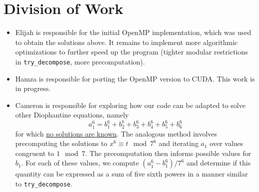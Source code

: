 \documentclass[11pt, letterpaper]{article}
\begin{document}
\section*{Division of Work}
\begin{itemize}
  \item Elijah is responsible for the initial OpenMP implementation, which was used to obtain the solutions above. It remains to implement more algorithmic optimizations to further speed up the program (tighter modular restrictions in \texttt{try\_decompose}, more precomputation).
  \item Hamza is responsible for porting the OpenMP version to CUDA. This work is in progress.
  \item Cameron is responsible for exploring how our code can be adapted to solve other Diophantine equations, namely
  \begin{equation*}
    a_1^6 = b_1^6 + b_2^b + b_3^6 + b_4^6 + b_5^6 + b_6^6
  \end{equation*}
  for which \href{http://euler.free.fr/}{no solutions are known}. The analogous method involves precomputing the solutions to $x^6 \equiv t \mod 7^6$ and iterating $a_1$ over values congruent to $1 \mod 7$. The precomputation then informs possible values for $b_1$. For each of these values, we compute $(a_1^6 - b_1^6) / 7^6$ and determine if this quantity can be expressed as a sum of five sixth powers in a manner similar to \texttt{try\_decompose}.
\end{itemize}



\end{document}
